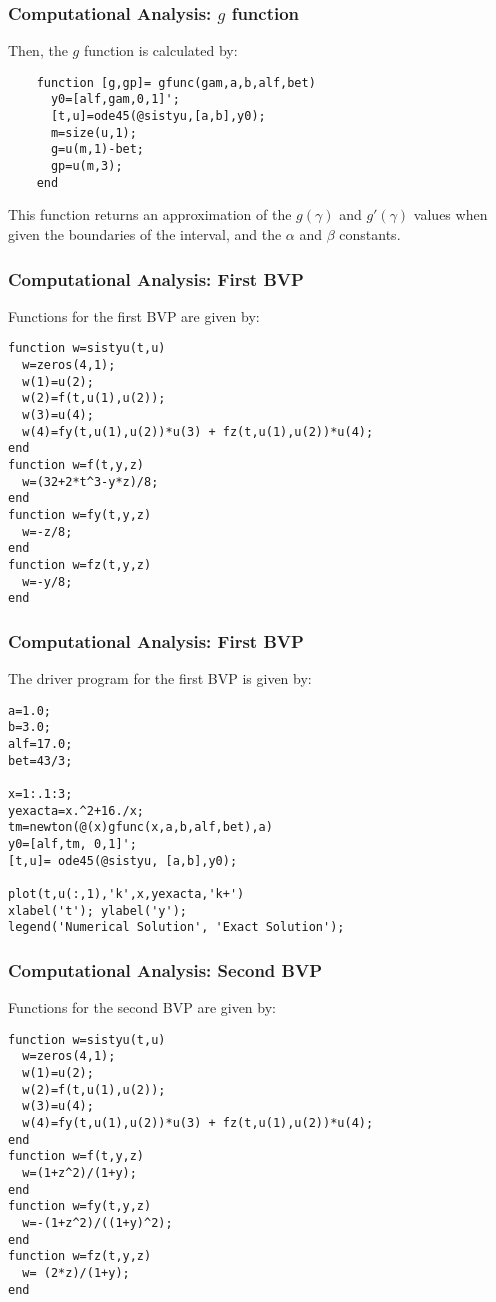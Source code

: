 \documentclass{beamer}
\begin{document}
\begin{frame}[fragile]
\frametitle{Computational Analysis: $g$ function} 
Then, the $g$ function is calculated by:
\begin{lstlisting}
    function [g,gp]= gfunc(gam,a,b,alf,bet)
      y0=[alf,gam,0,1]';
      [t,u]=ode45(@sistyu,[a,b],y0);
      m=size(u,1);
      g=u(m,1)-bet;
      gp=u(m,3);
    end
\end{lstlisting}
This function returns an approximation of the $g(\gamma)$ and $g'(\gamma)$ values when given the boundaries of the interval, and the $\alpha$ and $\beta$ constants.
\end{frame}
\begin{frame}[fragile]
\frametitle{Computational Analysis: First BVP} %
Functions for the first BVP are given by:
\begin{lstlisting}
function w=sistyu(t,u)
  w=zeros(4,1);
  w(1)=u(2);
  w(2)=f(t,u(1),u(2));
  w(3)=u(4);
  w(4)=fy(t,u(1),u(2))*u(3) + fz(t,u(1),u(2))*u(4);
end 
function w=f(t,y,z)
  w=(32+2*t^3-y*z)/8;
end
function w=fy(t,y,z)
  w=-z/8;
end
function w=fz(t,y,z)
  w=-y/8;
end
\end{lstlisting}
\end{frame}

\begin{frame}[fragile] %
\frametitle{Computational Analysis: First BVP} 
The driver program for the first BVP is given by:
\begin{lstlisting}
a=1.0;
b=3.0;
alf=17.0;
bet=43/3;

x=1:.1:3;
yexacta=x.^2+16./x;
tm=newton(@(x)gfunc(x,a,b,alf,bet),a)
y0=[alf,tm, 0,1]';
[t,u]= ode45(@sistyu, [a,b],y0);

plot(t,u(:,1),'k',x,yexacta,'k+')
xlabel('t'); ylabel('y');
legend('Numerical Solution', 'Exact Solution');
\end{lstlisting}
\end{frame}

\begin{frame}[fragile]
\frametitle{Computational Analysis: Second BVP} %
Functions for the second BVP are given by:
\begin{lstlisting}
function w=sistyu(t,u)
  w=zeros(4,1);
  w(1)=u(2);
  w(2)=f(t,u(1),u(2));
  w(3)=u(4);
  w(4)=fy(t,u(1),u(2))*u(3) + fz(t,u(1),u(2))*u(4);
end 
function w=f(t,y,z)
  w=(1+z^2)/(1+y);
end
function w=fy(t,y,z)
  w=-(1+z^2)/((1+y)^2);
end
function w=fz(t,y,z)
  w= (2*z)/(1+y);
end
\end{lstlisting}
\end{frame}
\end{document}
